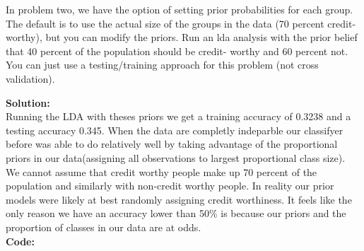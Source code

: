 \documentclass[12pt]{article}
\makeatletter
\theoremstyle{homework}
\newenvironment{exercise}[1]
{\def\@currentlabel{#1}\exercisecore}
{\endexercisecore}
\newcommand{\localhead}[1]{\par\smallskip\noindent\textbf{#1}\nobreak\\}%
\newcommand\solution{\localhead{Solution:}}
\makeatother
\begin{document}
\begin{exercise}{3} In problem two, we have the option of setting prior probabilities for each group. The default is to use the actual size of the groups in the data (70
  percent credit-worthy), but you can modify the priors. Run an lda analysis with the prior belief that 40 percent of the population should be credit-
  worthy and 60 percent not. You can just use a testing/training approach for this problem (not cross validation).\\
  \solution Running the LDA with theses priors we get a training accuracy of 0.3238  and a testing accuracy 0.345. When the data are completly indeparble our classifyer before was able to do relatively well 
  by taking advantage of the proportional priors in our data(assigning all observations to largest proportional class size). We cannot assume that credit worthy people make up 70 percent of the population and similarly with non-credit worthy people. In reality our prior models 
  were likely at best randomly assigning credit worthiness. It feels like the only reason we have an accuracy lower than 50\% is because our priors and the proportion of classes in our data are at odds.\\
  \textbf{Code:}
  \begin{center}
  
  \end{center}
\end{exercise}
\vspace{.5in}
\end{document}

